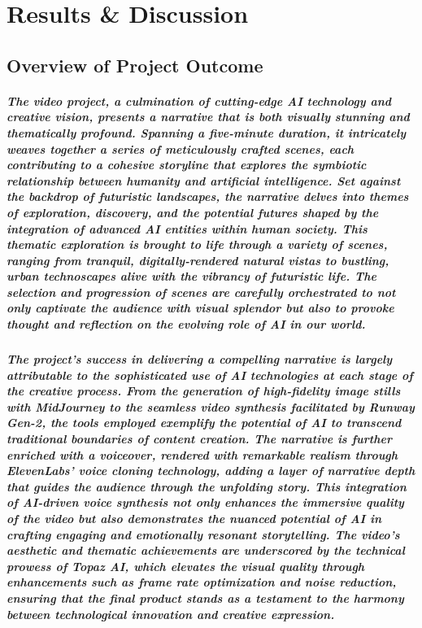 \documentclass[11pt,a4paper,oneside]{report}
\begin{document}
\chapter{Results \& Discussion}
\label{results}
\section{Overview of Project Outcome}

\paragraph{The video project, a culmination of cutting-edge AI technology and creative vision, presents a narrative that is both visually stunning and thematically profound. Spanning a five-minute duration, it intricately weaves together a series of meticulously crafted scenes, each contributing to a cohesive storyline that explores the symbiotic relationship between humanity and artificial intelligence. Set against the backdrop of futuristic landscapes, the narrative delves into themes of exploration, discovery, and the potential futures shaped by the integration of advanced AI entities within human society. This thematic exploration is brought to life through a variety of scenes, ranging from tranquil, digitally-rendered natural vistas to bustling, urban technoscapes alive with the vibrancy of futuristic life. The selection and progression of scenes are carefully orchestrated to not only captivate the audience with visual splendor but also to provoke thought and reflection on the evolving role of AI in our world.}

\paragraph{The project's success in delivering a compelling narrative is largely attributable to the sophisticated use of AI technologies at each stage of the creative process. From the generation of high-fidelity image stills with MidJourney to the seamless video synthesis facilitated by Runway Gen-2, the tools employed exemplify the potential of AI to transcend traditional boundaries of content creation. The narrative is further enriched with a voiceover, rendered with remarkable realism through ElevenLabs' voice cloning technology, adding a layer of narrative depth that guides the audience through the unfolding story. This integration of AI-driven voice synthesis not only enhances the immersive quality of the video but also demonstrates the nuanced potential of AI in crafting engaging and emotionally resonant storytelling. The video's aesthetic and thematic achievements are underscored by the technical prowess of Topaz AI, which elevates the visual quality through enhancements such as frame rate optimization and noise reduction, ensuring that the final product stands as a testament to the harmony between technological innovation and creative expression.}
\end{document}
